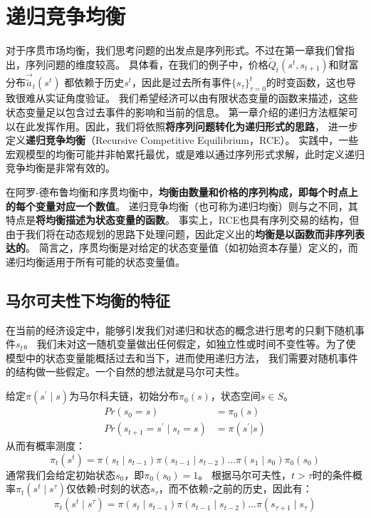 
\section{递归竞争均衡}  \label{sec-rce}

对于序贯市场均衡，我们思考问题的出发点是序列形式。不过在第一章我们曾指出，序列问题的维度较高。
具体看，在我们的例子中，价格$\tilde{Q}_t\left(s^t,s_{t+1}\right)$和财富分布$\vec{\tilde{a}}_t\left(s^t\right)$
都依赖于历史$s^t$，因此是过去所有事件$\{s_{\tau}\}_{\tau=0}^t$的时变函数，这也导致很难从实证角度验证。
我们希望经济可以由有限状态变量的函数来描述，这些状态变量足以包含过去事件的影响和当前的信息。
第一章介绍的递归方法框架可以在此发挥作用。因此，我们将依照\textbf{将序列问题转化为递归形式的思路}，
进一步定义\textbf{递归竞争均衡}（Recursive Competitive Equilibrium，RCE）。
实践中，一些宏观模型的均衡可能并非帕累托最优，或是难以通过序列形式求解，此时定义递归竞争均衡是非常有效的。

在阿罗-德布鲁均衡和序贯均衡中，\textbf{均衡由数量和价格的序列构成，即每个时点上的每个变量对应一个数值}。
递归竞争均衡（也可称为递归均衡）则与之不同，其特点是\textbf{将均衡描述为状态变量的函数}。
事实上，RCE也具有序列交易的结构，但由于我们将在动态规划的思路下处理问题，因此定义出的\textbf{均衡是以函数而非序列表达的}。
简言之，序贯均衡是对给定的状态变量值（如初始资本存量）定义的，而递归均衡适用于所有可能的状态变量值。


\subsection{马尔可夫性下均衡的特征}

在当前的经济设定中，能够引发我们对递归和状态的概念进行思考的只剩下随机事件$s_t$。
我们未对这一随机变量做出任何假定，如独立性或时间不变性等。为了使模型中的状态变量能概括过去和当下，进而使用递归方法，
我们需要对随机事件的结构做一些假定。一个自然的想法就是马尔可夫性。

给定$\pi\left(s^{\prime}\mid s\right)$为马尔科夫链，初始分布$\pi_0(s)$，状态空间$s\in S$。
\begin{equation*}
    \begin{aligned}
        Pr\left(s_0=s\right) &= \pi_0(s) \\
        Pr\left(s_{t+1}=s^{\prime}\mid s_t=s\right) &= \pi\left(s^{\prime}|s\right)
    \end{aligned}
\end{equation*}
从而有概率测度：
\begin{equation*}
    \pi_t\left(s^t\right)=
        \pi\left(s_t\mid s_{t-1}\right)\pi\left(s_{t-1}\mid s_{t-2}\right)\ldots\pi\left(s_1 \mid s_0\right)\pi_0\left(s_0\right)
\end{equation*}
通常我们会给定初始状态$s_0$，即$\pi_0\left(s_0\right)=1$。
根据马尔可夫性，$t>\tau$时的条件概率$\pi_t\left(s^t\mid s^{\tau}\right)$仅依赖$\tau$时刻的状态$s_{\tau}$，而不依赖$\tau$之前的历史，因此有：
\begin{equation}   \label{eq-rce-markov-s}
    \pi_t\left(s^t \mid s^\tau\right)=
        \pi\left(s_t \mid s_{t-1}\right) \pi\left(s_{t-1} \mid s_{t-2}\right) \ldots \pi\left(s_{\tau+1} \mid s_\tau\right)
\end{equation}


